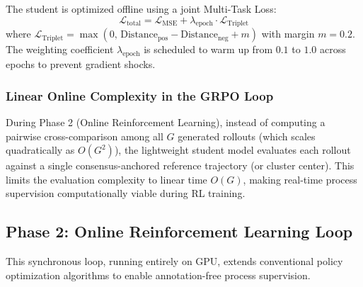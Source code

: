 \documentclass[conference]{IEEEtran}
\begin{document}
The student is optimized offline using a joint Multi-Task Loss:
\begin{equation}
\mathcal{L}_{\text{total}} = \mathcal{L}_{\text{MSE}} + \lambda_{\text{epoch}} \cdot \mathcal{L}_{\text{Triplet}}
\end{equation}
where $\mathcal{L}_{\text{Triplet}} = \max(0,\, \text{Distance}_{\text{pos}} - \text{Distance}_{\text{neg}} + m)$ with margin $m=0.2$. The weighting coefficient $\lambda_{\text{epoch}}$ is scheduled to warm up from $0.1$ to $1.0$ across epochs to prevent gradient shocks.

\subsubsection{Linear Online Complexity in the GRPO Loop}
During Phase 2 (Online Reinforcement Learning), instead of computing a pairwise cross-comparison among all $G$ generated rollouts (which scales quadratically as $O(G^2)$), the lightweight student model evaluates each rollout against a single consensus-anchored reference trajectory (or cluster center). This limits the evaluation complexity to linear time $O(G)$, making real-time process supervision computationally viable during RL training.

\subsection{Phase 2: Online Reinforcement Learning Loop}
This synchronous loop, running entirely on GPU, extends conventional policy optimization algorithms to enable annotation-free process supervision.
\end{document}
